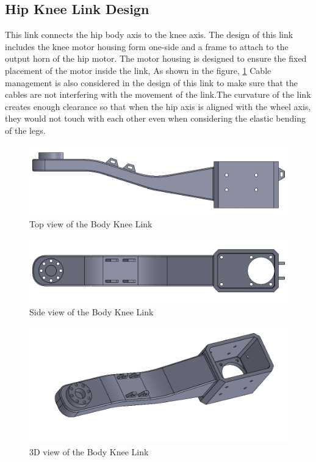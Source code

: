 \subsection{Hip Knee Link Design}
This link connects the hip body axis to the knee axis.
The design of this link includes the knee motor housing form one-side and a frame to attach to the output horn of the hip motor.
The motor housing is designed to ensure the fixed placement of the motor inside the link, As shown in the figure, \ref{fig:bodykneelink1} Cable management is also considered in the design of this link to make sure that the cables are not interfering with the movement of the link.The curvature of the link creates enough clearance so that when the hip axis is aligned with the wheel axis, they would not touch with each other even when considering the elastic bending of the legs.
\begin{figure}[h]
	\centering
	\includegraphics[width=1\linewidth]{Body_Knee_Link_1}
	\caption[Top view of the Body Knee Link]{Top view of the Body Knee Link}
	\label{fig:bodykneelink1}
\end{figure}
\begin{figure}[h]
	\centering
	\includegraphics[width=1\linewidth]{Body_Knee_Link_2}
	\caption[Side view of the Body Knee Link]{Side view of the Body Knee Link}
	\label{fig:bodykneelink2}
\end{figure}
\begin{figure}[h]
	\centering
	\includegraphics[width=1\linewidth]{Body_Knee_Link_3}
	\caption[3D view of the Body Knee Link]{3D view of the Body Knee Link}
	\label{fig:bodykneelink3}
\end{figure}

